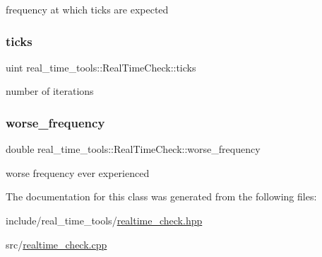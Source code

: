 frequency at which ticks are expected \mbox{\label{classreal__time__tools_1_1RealTimeCheck_ae2acb20d9f1e49cc35eb5505d63201aa}} 
\subsubsection{\texorpdfstring{ticks}{ticks}}
{\footnotesize\ttfamily uint real\+\_\+time\+\_\+tools\+::\+Real\+Time\+Check\+::ticks\hspace{0.3cm}{\ttfamily [private]}}

number of iterations \mbox{\label{classreal__time__tools_1_1RealTimeCheck_a3605c41d8c5c616879fa9af469860470}} 
\subsubsection{\texorpdfstring{worse\+\_\+frequency}{worse\_frequency}}
{\footnotesize\ttfamily double real\+\_\+time\+\_\+tools\+::\+Real\+Time\+Check\+::worse\+\_\+frequency\hspace{0.3cm}{\ttfamily [private]}}

worse frequency ever experienced 

The documentation for this class was generated from the following files\+:\begin{DoxyCompactItemize}
\item 
include/real\+\_\+time\+\_\+tools/\hyperlink{realtime__check_8hpp}{realtime\+\_\+check.\+hpp}\item 
src/\hyperlink{realtime__check_8cpp}{realtime\+\_\+check.\+cpp}\end{DoxyCompactItemize}
